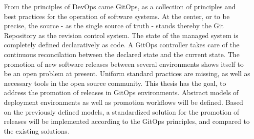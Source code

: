 
\noindent
From the principles of DevOps came GitOps,
as a collection of principles and best practices
for the operation of software systems. At the center,
or to be precise, the source - as the single source of truth -
stands thereby the Git Repository as the revision control system.
The state of the managed system is
completely defined declaratively as code. A GitOps controller
takes care of the continuous reconcilation between the
declared state and the current state.
The promotion of new software releases between several environments
shows itself to be an open problem at present.
Uniform standard practices are missing, as well as necessary tools in the open source community.
This thesis has the goal,
to address the promotion of releases in GitOps environments.
Abstract models of deployment environments as well as promotion workflows
will be defined.
Based on the previously defined models,
a standardized solution for the promotion of releases
will be implemented according to the GitOps principles,
and compared to the existing solutions.



